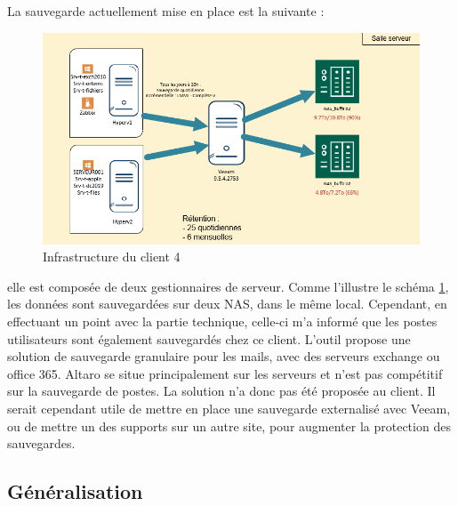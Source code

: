 \documentclass[pfe]{tnreport} %
\begin{document}
La sauvegarde actuellement mise en place est la suivante : 
\begin{figure}[ht]
 \centering
 \includegraphics[width=15cm]{figures/client4.png}
 \caption{Infrastructure du client 4}
 \label{fig:client4}
\end{figure}
elle est composée de deux gestionnaires de serveur. Comme l'illustre le schéma \ref{fig:client4}, les données sont sauvegardées sur deux NAS, dans le même local. \newline
Cependant, en effectuant un point avec la partie technique, celle-ci m'a informé que les postes utilisateurs sont également sauvegardés chez ce client. \newline 
L'outil propose une solution de sauvegarde granulaire pour les mails, avec des serveurs exchange ou office 365. \newline
Altaro se situe principalement sur les serveurs et n'est pas compétitif sur la sauvegarde de postes. \newline
La solution n'a donc pas été proposée au client. \newline
Il serait cependant utile de mettre en place une sauvegarde externalisé avec Veeam, ou de mettre un des supports sur un autre site, pour augmenter la protection des sauvegardes. \newline

\subsection{Généralisation}
\end{document}
